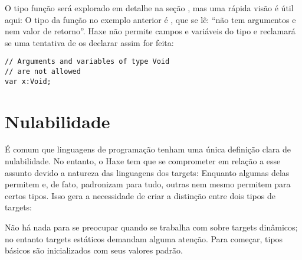 
O tipo função será explorado em detalhe na seção , mas uma rápida visão é útil aqui: O tipo da função  no exemplo anterior é , que se lê: ``não tem argumentos e nem valor de retorno''.
Haxe não permite campos e variáveis do tipo  e reclamará se uma tentativa de os declarar assim for feita:

\begin{lstlisting}
// Arguments and variables of type Void
// are not allowed
var x:Void;
\end{lstlisting}



\section{Nulabilidade}
\label{types-nullability}


É comum que linguagens de programação tenham uma única definição clara de nulabilidade. No entanto, o Haxe tem que se comprometer em relação a esse assunto devido a natureza das linguagens dos targets: Enquanto algumas delas permitem e, de fato, padronizam  para tudo, outras nem mesmo permitem  para certos tipos. Isso gera a necessidade de criar a distinção entre dois tipos de targets:



Não há nada para se preocupar quando se trabalha com  sobre targets dinâmicos; no entanto targets estáticos demandam alguma atenção. Para começar, tipos básicos são inicializados com seus valores padrão.


